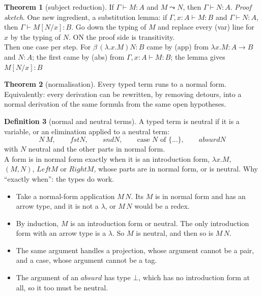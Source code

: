 \documentclass[a4paper, 11pt]{article}
\theoremstyle{definition}
\newtheorem{definition}{Definition}[section]
\newtheorem{theorem}[definition]{Theorem}
\begin{document}
\begin{theorem}[subject reduction]
    If $\Gamma \vdash M : A$ and $M \leadsto N$, then $\Gamma \vdash N : A$. \textit{Proof sketch}. One new ingredient,
    a substitution lemma: if $\Gamma, x : A \vdash M : B$ and $\Gamma \vdash N : A$, then $\Gamma \vdash M[N/x]:B$.
    Go down the typing of $M$ and replace every (var) line for $x$ by the typing of $N$. ON the proof side is transitivity. \\
    Then one case per step. For $\beta \, (\lambda. x. M) N: B$ came by (app) from $\lambda x. M : A \to B$ and $N : A$;
    the first came by (abs) from $\Gamma, x : A \vdash M : B$; the lemma gives $M[N/x]:B$
\end{theorem}

\begin{theorem}[normalisation]
    Every typed term runs to a normal form. Equivalently: every derivation can be rewritten, by removing detours, into
    a normal derivation of the same formula from the same open hypotheses. 
\end{theorem}

\begin{definition}[normal and neutral terms]
    A typed term is neutral if it is a variable, or an elimination applied to a neutral term: \[
    N \, M, \qquad \mathit{fst} N, \qquad \mathit{snd} N, \qquad \text{case } N \text{ of \{...\}}, \qquad \mathit{absurd} N 
    \] with $N$ neutral and the other parts in normal form. \\
    A form is in normal form exactly when it is an introduction form, $\lambda x. M$, $(M, N)$, $\mathit{Left} M$ or
    $\mathit{Right} M$, whose parts are in normal form, or is neutral. Why ``exactly when'': the types do work.
    \begin{itemize}
        \item Take a normal-form application $M\,N$. Its $M$ is in normal form and has an arrow type, and it is not a
        $\lambda$, or $M \, N$ would be a redex.
        \item By induction, $M$ is an introduction form or neutral. The only introduction form with an arrow type is a
        $\lambda$. So $M$ is neutral, and then so is $M \, N$. 
        \item The same argument handles a projection, whose argument cannot be a pair, and a case, whose argument
        cannot be a tag.
        \item The argument of an $\mathit{absurd}$ has type $\bot$, which has no introduction form at all, so it too must
        be neutral.
    \end{itemize}
\end{definition}
\end{document}

